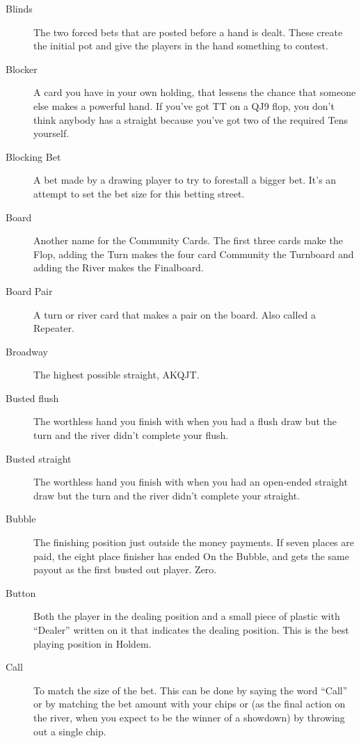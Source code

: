 \begin{description}
\item[Blinds] The two forced bets that are posted before a hand is
dealt. These create the initial pot and give the players in the hand
something to contest.

\item[Blocker] A card you have in your own holding, that lessens
the chance that someone else makes a powerful hand. If you've got TT
on a QJ9 flop, you don't think anybody has a straight because you've
got two of the required Tens yourself.

\item[Blocking Bet] A bet made by a drawing player to try to forestall
a  bigger bet. It's an attempt to set the bet size for this betting
street.

\item[Board] Another name for the Community Cards. The first three
cards make the Flop, adding the Turn makes the four card Community the
Turnboard and adding the River makes the Finalboard.

\item[Board Pair] A turn or river card that makes a pair on the
board. Also called a Repeater.

\item[Broadway] The highest possible straight, AKQJT.

\item[Busted flush] The worthless hand you finish with when you had a
flush draw but the turn and the river didn't complete your flush.

\item[Busted straight] The worthless hand you finish with when you had
an open-ended straight draw but the turn and the river didn't complete
your straight.

\item[Bubble] The finishing position just outside the money payments.
If seven places are paid, the eight place finisher has ended On the
Bubble, and gets the same payout as the first busted out player. Zero.

\item[Button] Both the player in the dealing position and a small
piece of plastic with ``Dealer'' written on it that indicates the
dealing position. This is the best playing position in Holdem.

\item[Call] To match the size of the bet. This can be done by saying
the word ``Call'' or by matching the bet amount with your chips or
(as the final action on the river, when you expect to be the winner of
a showdown) by throwing out a single chip.


\end{description}
